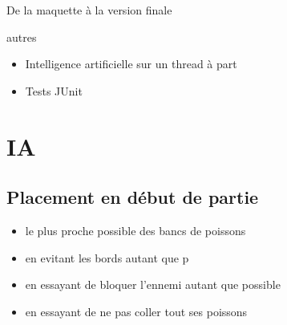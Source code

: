 \documentclass{beamer}
\begin{document}
\begin{frame}{De la maquette à la version finale}
\begin{frame}{}
\begin{block}{autres}
\begin{itemize}
\item<1-> Intelligence artificielle sur un thread à part
\item<2-> Tests JUnit
\end{itemize}
\end{block}
\end{frame}


\section{IA}

\subsection{Placement en début de partie}
\begin{frame}{}
\begin{block}{}
\begin{itemize}
 \item<1-> le plus proche possible des bancs de poissons
 \item<2-> en evitant les bords autant que p
 \item<3-> en essayant de bloquer l'ennemi autant que possible
 \item<4-> en essayant de ne pas coller tout ses poissons
\end{itemize}
\end{block}
\end{frame}


\end{frame}
\end{document}
